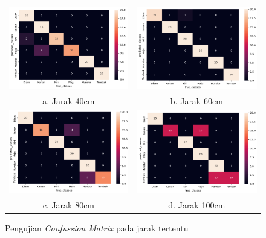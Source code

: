 \begin{figure}[H]
    \begin{tabular}{cc}
      \includegraphics[width=0.5\linewidth]{../Gambar/cm30.png} & \includegraphics[width=0.5\linewidth]{../Gambar/cm50.png} \\
      a. Jarak 40cm & b. Jarak 60cm \\ 
      \includegraphics[width=0.5\linewidth]{../Gambar/cm80.png} & \includegraphics[width=0.5\linewidth]{../Gambar/cm100.png} \\
      c. Jarak 80cm & d. Jarak 100cm
    \end{tabular}
    \centering
    \caption{Pengujian \emph{Confussion Matrix} pada jarak tertentu}
    \label{fig:confusionmatrixjarak}
\end{figure}

